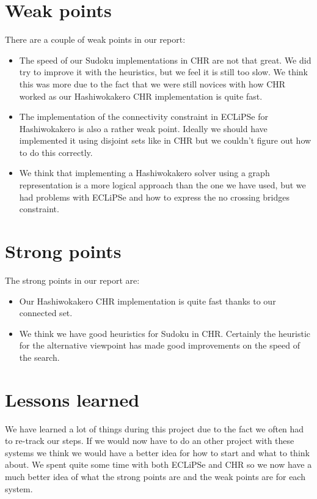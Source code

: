 \documentclass{report}
\begin{document}
\section{Weak points}
There are a couple of weak points in our report:
\begin{itemize}
    \item The speed of our Sudoku implementations in CHR are not that great. We did try to improve it with the heuristics, but we feel it is still too slow. We think this was more due to the fact that we were still novices with how CHR worked as our Hashiwokakero CHR implementation is quite fast.
    \item The implementation of the connectivity constraint in ECLiPSe for Hashiwokakero is also a rather weak point. Ideally we should have implemented it using disjoint sets like in CHR but we couldn't figure out how to do this correctly.
    \item We think that implementing a Hashiwokakero solver using a graph representation is a more logical approach than the one we have used, but we had problems with ECLiPSe and how to express the no crossing bridges constraint.
\end{itemize}
\section{Strong points}
The strong points in our report are:
\begin{itemize}
    \item Our Hashiwokakero CHR implementation is quite fast thanks to our connected set.
    \item We think we have good heuristics for Sudoku in CHR. Certainly the heuristic for the alternative viewpoint has made good improvements on the speed of the search.
\end{itemize}

\section{Lessons learned}
We have learned a lot of things during this project due to the fact we often had to re-track our steps. If we would now have to do an other project with these systems we think we would have a better idea for how to start and what to think about. We spent quite some time with both ECLiPSe and CHR so we now have a much better idea of what the strong points are and the weak points are for each system.
\end{document}
